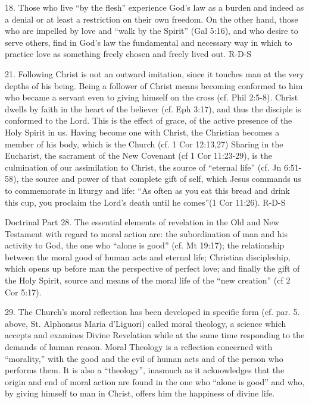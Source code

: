\documentclass[oneside]{book}
\begin{document}
18. Those who live ``by the flesh'' experience God's law as a burden and indeed
as a denial or at least a restriction on their own freedom. On the other hand,
those who are impelled by love and ``walk by the Spirit'' (Gal 5:16), and who
desire to serve others, find in God's law the fundamental and necessary way in
which to practice love as something freely chosen and freely lived out.
R-D-S

21. Following Christ is not an outward imitation, since it touches man at the
very depths of his being. Being a follower of Christ means becoming conformed to
him who became a servant even to giving himself on the cross (cf. Phil
2:5-8). Christ dwells by faith in the heart of the believer (cf. Eph 3:17), and
thus the disciple is conformed to the Lord. This is the effect of grace, of the
active presence of the Holy Spirit in us. Having become one with Christ, the
Christian 
becomes a member of his body, which is the Church (cf. 1 Cor 12:13,27) Sharing
in the Eucharist, the sacrament of the New Covenant (cf 1 Cor 11:23-29), is the
culmination of our assimilation to Christ, the source of ``eternal life''
(cf. Jn 6:51-58), the source and power of that complete gift of self, which
Jesus commands us to commemorate in liturgy and life: ``As often as you eat this
bread and drink this cup, you proclaim the Lord's death until he comes''(1 Cor
11:26).
R-D-S

Doctrinal Part
28. The essential elements of revelation in the Old and New Testament with
regard to moral action are: the subordination of man and his activity to God,
the one who ``alone is good'' (cf. Mt 19:17); the relationship between the moral
good of human acts and eternal life; Christian discipleship, which opens up
before man the perspective of perfect love; and finally the gift of the Holy
Spirit, source and means of the moral life of the ``new creation'' (cf 2 Cor
5:17).

29. The Church's moral reflection has been developed in specific form
(cf. par. 5. above, St. Alphonsus Maria d'Liguori) called moral theology, a
science which accepts and examines Divine Revelation while at the same time
responding to the demands of human reason. Moral Theology is a reflection
concerned with ``morality,'' with the good and the evil of human acts and of the
person who performs them. It is also a ``theology'', inasmuch as it acknowledges
that the origin and end of moral action are found in the one who ``alone is
good'' and who, by giving himself to man in Christ, offers him the happiness of
divine life.
\end{document}
